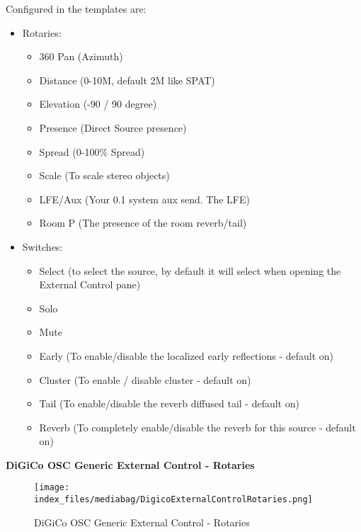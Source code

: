 \documentclass[
  letterpaper,
  DIV=11,
  numbers=noendperiod]{scrreport}
\providecommand{\tightlist}{%
  \setlength{\itemsep}{0pt}\setlength{\parskip}{0pt}}\usepackage{longtable,booktabs,array}
\begin{document}
Configured in the templates are:

\begin{itemize}
\tightlist
\item
  Rotaries:

  \begin{itemize}
  \tightlist
  \item
    360 Pan (Azimuth)
  \item
    Distance (0-10M, default 2M like SPAT)
  \item
    Elevation (-90 / 90 degree)
  \item
    Presence (Direct Source presence)
  \item
    Spread (0-100\% Spread)
  \item
    Scale (To scale stereo objects)
  \item
    LFE/Aux (Your 0.1 system aux send. The LFE)
  \item
    Room P (The presence of the room reverb/tail)
  \end{itemize}
\item
  Switches:

  \begin{itemize}
  \tightlist
  \item
    Select (to select the source, by default it will select when opening
    the External Control pane)
  \item
    Solo
  \item
    Mute
  \item
    Early (To enable/disable the localized early reflections - default
    on)
  \item
    Cluster (To enable / disable cluster - default on)
  \item
    Tail (To enable/disable the reverb diffused tail - default on)
  \item
    Reverb (To completely enable/disable the reverb for this source -
    default on)
  \end{itemize}
\end{itemize}

\textbf{DiGiCo OSC Generic External Control - Rotaries}

\begin{figure}

{\centering \texttt{[image: index\_files/mediabag/DigicoExternalControlRotaries.png]}

}

\caption{DiGiCo OSC Generic External Control - Rotaries}

\end{figure}
\end{document}
